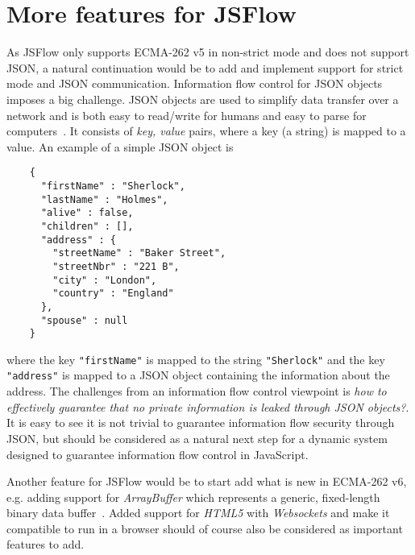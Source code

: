\section{More features for JSFlow}
As JSFlow only supports ECMA-262 v5 in non-strict mode and does not support JSON, a natural continuation would be to add and implement support for strict mode and JSON communication. Information flow control for JSON objects imposes a big challenge. JSON objects are used to simplify data transfer over a network and is both easy to read/write for humans and easy to parse for computers~\cite{json}. It consists of \emph{key, value} pairs, where a key (a string) is mapped to a value. An example of a simple JSON object is
\begin{verbatim}
    {
      "firstName" : "Sherlock",
      "lastName" : "Holmes",
      "alive" : false,
      "children" : [],
      "address" : {
        "streetName" : "Baker Street",
        "streetNbr" : "221 B",
        "city" : "London",
        "country" : "England"
      },
      "spouse" : null
    }
\end{verbatim}
where the key {\tt "firstName"} is mapped to the string {\tt "Sherlock"} and the key {\tt "address"} is mapped to a JSON object containing the information about the address. The challenges from an information flow control viewpoint is \emph{how to effectively guarantee that no private information is leaked through JSON objects?}. It is easy to see it is not trivial to guarantee information flow security through JSON, but should be considered as a natural next step for a dynamic system designed to guarantee information flow control in JavaScript.

Another feature for JSFlow would be to start add what is new in ECMA-262 v6, e.g. adding support for \emph{ArrayBuffer} which represents a generic, fixed-length binary data buffer~\cite{js_arraybuffer}. Added support for \emph{HTML5} with \emph{Websockets} and make it compatible to run in a browser should of course also be considered as important features to add.

